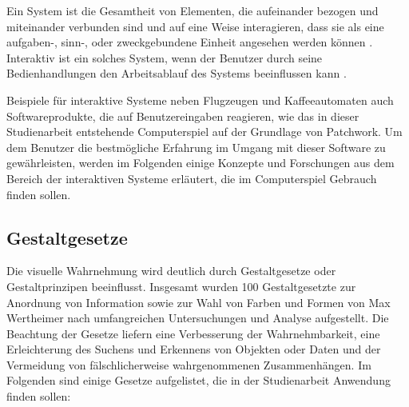 Ein System ist die Gesamtheit von Elementen, die aufeinander bezogen und miteinander verbunden sind und auf eine Weise interagieren, dass sie als eine aufgaben-, sinn-, oder zweckgebundene Einheit angesehen werden können \cite{2014.Systeme}. Interaktiv ist ein solches System, wenn der Benutzer durch seine Bedienhandlungen den Arbeitsablauf des Systems beeinflussen kann \cite[S. 3]{2011.Heinecke}.

Beispiele für interaktive Systeme neben Flugzeugen und Kaffeeautomaten auch Softwareprodukte, die auf Benutzereingaben reagieren, wie das in dieser Studienarbeit entstehende Computerspiel auf der Grundlage von Patchwork. Um dem Benutzer die bestmögliche Erfahrung im Umgang mit dieser Software zu gewährleisten, werden im Folgenden einige Konzepte und Forschungen aus dem Bereich der interaktiven Systeme erläutert, die im Computerspiel Gebrauch finden sollen.

\subsection{Gestaltgesetze}
Die visuelle Wahrnehmung wird deutlich durch Gestaltgesetze oder Gestaltprinzipen beeinflusst. Insgesamt wurden 100 Gestaltgesetzte zur Anordnung von Information sowie zur Wahl von Farben und Formen von Max Wertheimer nach umfangreichen Untersuchungen und Analyse aufgestellt. Die Beachtung der Gesetze liefern eine Verbesserung der Wahrnehmbarkeit, eine Erleichterung des Suchens und Erkennens von Objekten oder Daten und der Vermeidung von fälschlicherweise wahrgenommenen Zusammenhängen. \cite[S. 55 f.]{2010.Preim} Im Folgenden sind einige Gesetze aufgelistet, die in der Studienarbeit Anwendung finden sollen:

